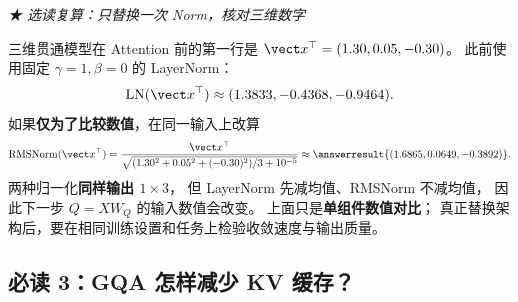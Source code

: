 \begin{example}[breakable]
\noindent\emph{\texorpdfstring{{\symboliconfont ★}}{★} 选读复算：只替换一次 Norm，核对三维数字}\par

三维贯通模型在 Attention 前的第一行是
$\vect x^\top=(1.30,0.05,-0.30)$。
此前使用固定 $\gamma=1,\beta=0$ 的 LayerNorm：
\[
\operatorname{LN}(\vect x^\top)\approx(1.3833,-0.4368,-0.9464).
\]
如果\textbf{仅为了比较数值}，在同一输入上改算
\[
\operatorname{RMSNorm}(\vect x^\top)
=\frac{\vect x^\top}{
\sqrt{(1.30^2+0.05^2+(-0.30)^2)/3+10^{-5}}}
\approx\answerresult{(1.6865,0.0649,-0.3892)}.
\]
两种归一化\textbf{同样输出 $1\times3$}，
但 LayerNorm 先减均值、RMSNorm 不减均值，
因此下一步 $Q=XW_Q$ 的输入数值会改变。
上面只是\textbf{单组件数值对比}；
真正替换架构后，要在相同训练设置和任务上检验收敛速度与输出质量。

\end{example}

\subsection{必读 3：GQA 怎样减少 KV 缓存？}
\label{sec:modern-gqa}
\label{concept:mqa}
\label{partq:architecture}

